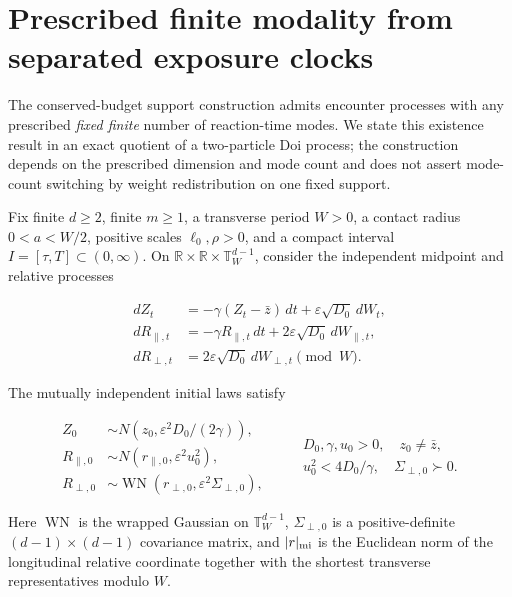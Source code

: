\documentclass{iopjournal}
\theoremstyle{plain}
\theoremstyle{definition}
\begin{document}
\section{Prescribed finite modality from separated exposure clocks}
\label{sec:exact-m-spine}

The conserved-budget support construction admits encounter processes with any
prescribed \emph{fixed finite} number of reaction-time modes.  We state this
existence result in an exact quotient of a two-particle Doi process; the
construction depends on the prescribed dimension and mode count and does not
assert mode-count switching by weight redistribution on one fixed support.

Fix finite $d\ge2$, finite $m\ge1$, a transverse period $W>0$, a contact
radius $0<a<W/2$, positive scales $\ell_0,\rho>0$, and a compact interval
$I=[\tau,T]\subset(0,\infty)$.
On $\mathbb R\times\mathbb R\times\mathbb T_W^{d-1}$, consider the
independent midpoint and relative processes

\begin{equation}
 \begin{aligned}
 dZ_t&=-\gamma(Z_t-\bar z)\,dt
       +\varepsilon\sqrt{D_0}\,dW_t,\\
 dR_{\parallel,t}&=-\gamma R_{\parallel,t}\,dt
       +2\varepsilon\sqrt{D_0}\,dW_{\parallel,t},\\
 dR_{\perp,t}&=2\varepsilon\sqrt{D_0}\,dW_{\perp,t}\pmod W.
 \end{aligned}
 \label{eq:exact-m-process}
\end{equation}

The mutually independent initial laws satisfy

\begin{equation}
 \begin{aligned}
 Z_0&\sim N\!\left(z_0,\varepsilon^2D_0/(2\gamma)\right),\\
 R_{\parallel,0}&\sim N(r_{\parallel,0},\varepsilon^2u_0^2),\\
 R_{\perp,0}&\sim
 \operatorname{WN}(r_{\perp,0},\varepsilon^2\Sigma_{\perp,0}),
 \end{aligned}
 \qquad
 \begin{gathered}
 D_0,\gamma,u_0>0,\quad z_0\ne\bar z,\\
 u_0^2<4D_0/\gamma,\quad \Sigma_{\perp,0}\succ0.
 \end{gathered}
 \label{eq:exact-m-initial}
\end{equation}

Here $\operatorname{WN}$ is the wrapped Gaussian on
$\mathbb T_W^{d-1}$, $\Sigma_{\perp,0}$ is a positive-definite
$(d-1)\times(d-1)$ covariance matrix, and $|r|_{\rm mi}$ is the Euclidean norm
of the longitudinal relative coordinate together with the shortest transverse
representatives modulo $W$.
\end{document}
